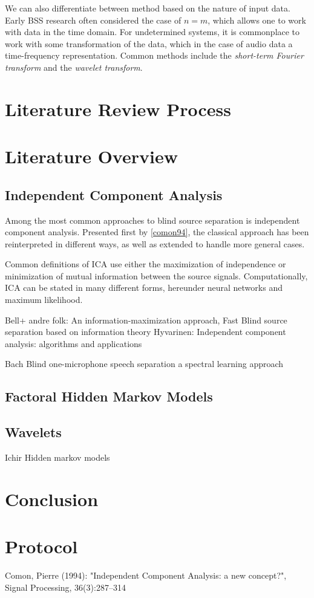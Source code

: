 \documentclass[11pt, oneside, a4paper]{article}
\begin{document}
We can also differentiate between method based on the nature of input data. Early BSS research often considered the case of $n=m$, which allows one to work with data in the time domain. For undetermined systems, it is commonplace to work with some transformation of the data, which in the case of audio data a time-frequency representation. Common methods include the \emph{short-term Fourier transform} and the \emph{wavelet transform}.

\section{Literature Review Process} %



\section{Literature Overview}


\subsection{Independent Component Analysis} %

Among the most common approaches to blind source separation is
independent component analysis. Presented first by \ref{comon94}, the
classical approach has been reinterpreted in different ways, as well
as extended to handle more general cases. 

Common definitions of ICA use either the maximization of independence
or minimization of mutual information between the source
signals. Computationally, ICA can be stated in many different forms,
hereunder neural networks and  maximum likelihood.



Bell+ andre folk: An information-maximization approach, Fast Blind
source separation based on information theory
Hyvarinen: Independent component analysis: algorithms and applications

Bach Blind one-microphone speech separation a spectral learning approach


\subsection{Factoral Hidden Markov Models} %


\subsection{Wavelets} %
Ichir Hidden markov models

\section{Conclusion}

\theappendix

\section{Protocol}


\begin{thebibliography}{99}
 Comon, Pierre (1994): "Independent Component Analysis: a new concept?", Signal Processing, 36(3):287–314

  
\end{thebibliography}
\end{document}
